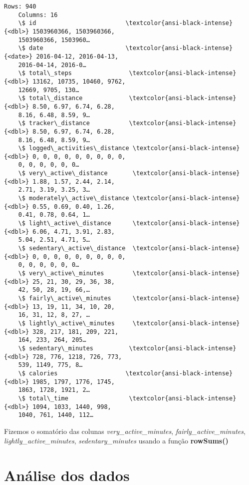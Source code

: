 \begin{Verbatim}[commandchars=\\\{\}]
    Rows: 940
    Columns: 16
    \$ id                         \textcolor{ansi-black-intense}{<dbl>} 1503960366, 1503960366,
    1503960366, 1503960…
    \$ date                       \textcolor{ansi-black-intense}{<date>} 2016-04-12, 2016-04-13,
    2016-04-14, 2016-0…
    \$ total\_steps                \textcolor{ansi-black-intense}{<dbl>} 13162, 10735, 10460, 9762,
    12669, 9705, 130…
    \$ total\_distance             \textcolor{ansi-black-intense}{<dbl>} 8.50, 6.97, 6.74, 6.28,
    8.16, 6.48, 8.59, 9…
    \$ tracker\_distance           \textcolor{ansi-black-intense}{<dbl>} 8.50, 6.97, 6.74, 6.28,
    8.16, 6.48, 8.59, 9…
    \$ logged\_activities\_distance \textcolor{ansi-black-intense}{<dbl>} 0, 0, 0, 0, 0, 0, 0, 0, 0,
    0, 0, 0, 0, 0, 0…
    \$ very\_active\_distance       \textcolor{ansi-black-intense}{<dbl>} 1.88, 1.57, 2.44, 2.14,
    2.71, 3.19, 3.25, 3…
    \$ moderately\_active\_distance \textcolor{ansi-black-intense}{<dbl>} 0.55, 0.69, 0.40, 1.26,
    0.41, 0.78, 0.64, 1…
    \$ light\_active\_distance      \textcolor{ansi-black-intense}{<dbl>} 6.06, 4.71, 3.91, 2.83,
    5.04, 2.51, 4.71, 5…
    \$ sedentary\_active\_distance  \textcolor{ansi-black-intense}{<dbl>} 0, 0, 0, 0, 0, 0, 0, 0, 0,
    0, 0, 0, 0, 0, 0…
    \$ very\_active\_minutes        \textcolor{ansi-black-intense}{<dbl>} 25, 21, 30, 29, 36, 38,
    42, 50, 28, 19, 66,…
    \$ fairly\_active\_minutes      \textcolor{ansi-black-intense}{<dbl>} 13, 19, 11, 34, 10, 20,
    16, 31, 12, 8, 27, …
    \$ lightly\_active\_minutes     \textcolor{ansi-black-intense}{<dbl>} 328, 217, 181, 209, 221,
    164, 233, 264, 205…
    \$ sedentary\_minutes          \textcolor{ansi-black-intense}{<dbl>} 728, 776, 1218, 726, 773,
    539, 1149, 775, 8…
    \$ calories                   \textcolor{ansi-black-intense}{<dbl>} 1985, 1797, 1776, 1745,
    1863, 1728, 1921, 2…
    \$ total\_time                 \textcolor{ansi-black-intense}{<dbl>} 1094, 1033, 1440, 998,
    1040, 761, 1440, 112…
\end{Verbatim}

Fizemos o somatório das colunas \emph{very\_active\_minutes},
\emph{fairly\_active\_minutes}, \emph{lightly\_active\_minutes},
\emph{sedentary\_minutes} usando a função \textbf{rowSums()}

\section{Análise dos dados}


